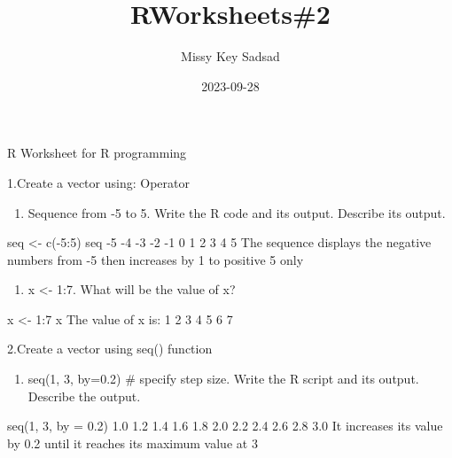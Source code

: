\documentclass[
]{article}
\title{RWorksheets\#2}
\author{Missy Key Sadsad}
\date{2023-09-28}
\newenvironment{Shaded}{\begin{snugshade}}{\end{snugshade}}
\newcommand{\NormalTok}[1]{#1}
\providecommand{\tightlist}{%
  \setlength{\itemsep}{0pt}\setlength{\parskip}{0pt}}
\begin{document}
\maketitle

R Worksheet for R programming

1.Create a vector using: Operator

\begin{enumerate}
\def\labelenumi{\alph{enumi}.}
\tightlist
\item
  Sequence from -5 to 5. Write the R code and its output. Describe its
  output.
\end{enumerate}

\begin{Shaded}
\begin{Highlighting}[]
\NormalTok{seq \textless{}{-} c({-}5:5)  }
\NormalTok{seq}
\NormalTok{{-}5 {-}4 {-}3 {-}2 {-}1  0  1  2  3  4  5 }
\NormalTok{The sequence displays the negative numbers from {-}5 then increases by 1 to positive 5 only}
\end{Highlighting}
\end{Shaded}

\begin{enumerate}
\def\labelenumi{\alph{enumi}.}
\setcounter{enumi}{1}
\tightlist
\item
  x \textless- 1:7. What will be the value of x?
\end{enumerate}

\begin{Shaded}
\begin{Highlighting}[]
\NormalTok{x \textless{}{-} 1:7}
\NormalTok{x}
\NormalTok{The value of x is: }
\NormalTok{1 2 3 4 5 6 7}
\end{Highlighting}
\end{Shaded}

2.Create a vector using seq() function

\begin{enumerate}
\def\labelenumi{\alph{enumi}.}
\tightlist
\item
  seq(1, 3, by=0.2) \# specify step size. Write the R script and its
  output. Describe the output.
\end{enumerate}

\begin{Shaded}
\begin{Highlighting}[]
\NormalTok{seq(1, 3, by = 0.2) }
\NormalTok{1.0 1.2 1.4 1.6 1.8 2.0 2.2 2.4 2.6 2.8 3.0 }
\NormalTok{It increases its value by 0.2 until it reaches its maximum value at 3}
\end{Highlighting}
\end{Shaded}
\end{document}
